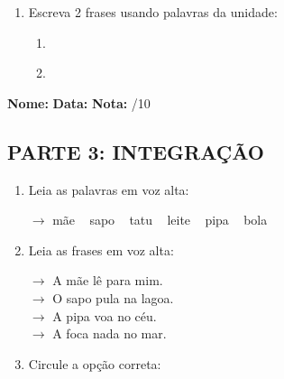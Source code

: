 \begin{exercicio}
\begin{enumerate}[resume]
  \item Escreva 2 frases usando palavras da unidade:
  \begin{enumerate}[label=\alph*)]
    \item \underline{\hspace{8cm}}
    \item \underline{\hspace{8cm}}
  \end{enumerate}

\end{enumerate}

\end{exercicio}



\begin{exercicio}

\noindent\textbf{Nome:} \underline{\hspace{3.2cm}} \quad \textbf{Data:} \underline{\hspace{1.6cm}} \quad \textbf{Nota:} \underline{\hspace{0.9cm}}/10


\subsection*{PARTE 3: INTEGRAÇÃO}

\begin{enumerate}[resume]

  \item Leia as palavras em voz alta:
  \begin{center}
  $\rightarrow$ mãe ~ sapo ~ tatu ~ leite ~ pipa ~ bola
  \end{center}

  \item Leia as frases em voz alta:
  \begin{center}
  $\rightarrow$ A mãe lê para mim.\\
  $\rightarrow$ O sapo pula na lagoa.\\
  $\rightarrow$ A pipa voa no céu.\\
  $\rightarrow$ A foca nada no mar.\\
  \end{center}

  \item Circule a opção correta:
  \begin{enumerate}[label=(\alph*)]


\end{enumerate}
\end{enumerate}
\end{exercicio}
